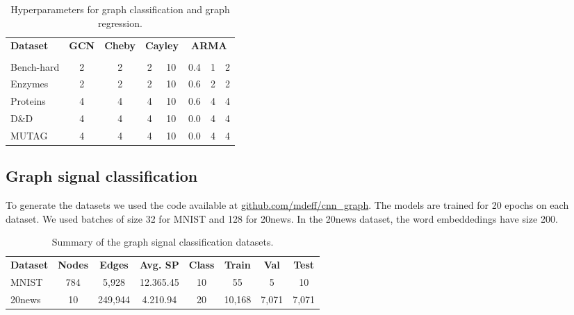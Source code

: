 \documentclass{article}
\begin{document}
\begin{table}[!ht]
\setlength\tabcolsep{.5em} \small
\centering
\caption{Hyperparameters for graph classification and graph regression.}
\bgroup
\def\arraystretch{1.0} \begin{tabular}{l|c|c|cc|ccc}
\cmidrule[1.5pt]{1-8}
\multirow{2}{*}{\textbf{Dataset}} & \textbf{GCN} & \textbf{Cheby} & \multicolumn{2}{c|}{\textbf{Cayley}} & \multicolumn{3}{c}{\textbf{ARMA}} \\
                                   &  &  &  &  &  &  &             \\
\midrule
Bench-hard  & 2 & 2 & 2 & 10 & 0.4 & 1 & 2 \\
Enzymes     & 2 & 2 & 2 & 10 & 0.6 & 2 & 2 \\
Proteins    & 4 & 4 & 4 & 10 & 0.6 & 4 & 4 \\  
D\&D        & 4 & 4 & 4 & 10 & 0.0 & 4 & 4 \\
MUTAG       & 4 & 4 & 4 & 10 & 0.0 & 4 & 4 \\
\cmidrule[1.5pt]{1-8}
\end{tabular}
\label{tab:hyper_gc}
\egroup
\end{table}


\subsection{Graph signal classification}

To generate the datasets we used the code available at \url{github.com/mdeff/cnn_graph}.
The models are trained for 20 epochs on each dataset. We used batches of size 32 for MNIST and 128 for 20news.
In the 20news dataset, the word embeddedings have size 200.

\begin{table}[!ht]
\setlength\tabcolsep{.15em} \small
\centering
\caption{Summary of the graph signal classification datasets.}
\bgroup
\def\arraystretch{1.1} \begin{tabular}{lccccccc}
\cmidrule[1.5pt]{1-8}
\textbf{Dataset} & \textbf{Nodes} & \textbf{Edges} & \textbf{Avg. SP} & \textbf{Class} & \textbf{Train} & \textbf{Val} & \textbf{Test} \\
\cmidrule[.5pt]{1-8}
MNIST    & 784    & 5,928    & 12.36\tiny{5.45} & 10 & 55 & 5 & 10 \\
20news   & 10 & 249,944  & 4.21\tiny{0.94}  & 20 & 10,168 & 7,071 & 7,071  \\
\cmidrule[1.5pt]{1-8}
\end{tabular}
\label{tab:stats_gsc}
\egroup
\end{table}
\end{document}
